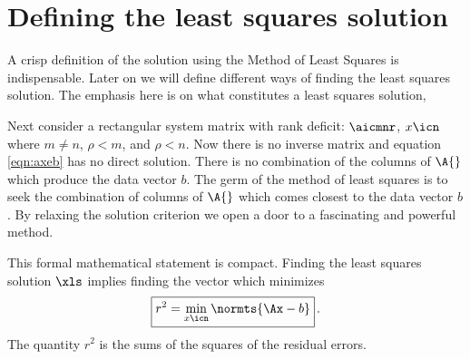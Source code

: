 \section{Defining the least squares solution}

A crisp definition of the solution using the Method of Least Squares is indispensable. Later on we will define different ways of finding the least squares solution. The emphasis here is on what constitutes a least squares solution,


Next consider a rectangular system matrix with rank deficit: $\aicmnr$, $x\icn$ where $m\ne n$, $\rho < m$, and $\rho < n$. Now there is no inverse matrix and equation \eqref{eqn:axeb} has no direct solution. There is no combination of the columns of $\A{}$ which produce the data vector $b$. The germ of the method of least squares is to seek the combination of columns of $\A{}$ which comes closest to the data vector $b$. By relaxing the solution criterion we open a door to a fascinating and powerful method. 

This formal mathematical statement is compact. Finding the least squares solution $\xls$ implies finding the vector which minimizes
\begin{equation}
  \boxed{ r^{2} = \min_{x\icn} \normts{\Ax-b} }\, .
  \label{eq:least squares:criterion}
\end{equation}
The quantity $r^{2}$ is the sums of the squares of the residual errors.



\endinput